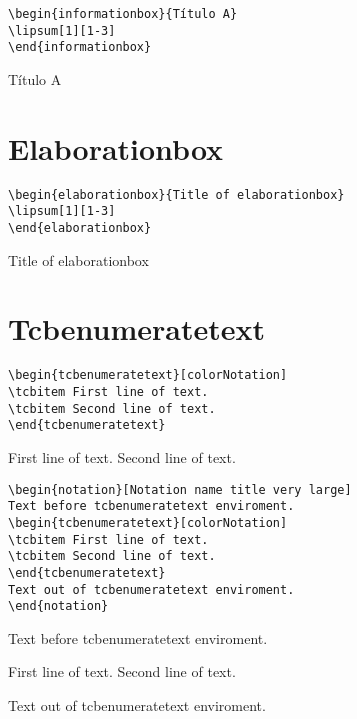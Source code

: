 \lipsum[1][1-3]

\begin{verbatim}
\begin{informationbox}{Título A}
\lipsum[1][1-3]
\end{informationbox}
\end{verbatim}
\begin{informationbox}{Título A}
\lipsum[1][1-3]
\end{informationbox}


\section{Elaborationbox}

\lipsum[1][1-3]

\begin{verbatim}
\begin{elaborationbox}{Title of elaborationbox}
\lipsum[1][1-3]
\end{elaborationbox}
\end{verbatim}
\begin{elaborationbox}{Title of elaborationbox}
\lipsum[1][1-3]
\end{elaborationbox}

\section{Tcbenumeratetext}

\begin{verbatim}
\begin{tcbenumeratetext}[colorNotation]
\tcbitem First line of text.
\tcbitem Second line of text.
\end{tcbenumeratetext}
\end{verbatim}
\begin{tcbenumeratetext}[colorNotation]
\tcbitem First line of text.
\tcbitem Second line of text.
\end{tcbenumeratetext}

\lipsum[1][1-3]

\begin{verbatim}
\begin{notation}[Notation name title very large]
Text before tcbenumeratetext enviroment.
\begin{tcbenumeratetext}[colorNotation]
\tcbitem First line of text.
\tcbitem Second line of text.
\end{tcbenumeratetext}
Text out of tcbenumeratetext enviroment.
\end{notation}
\end{verbatim}
\begin{notation}
Text before tcbenumeratetext enviroment.
\begin{tcbenumeratetext}[colorNotation]
\tcbitem First line of text.
\tcbitem Second line of text.
\end{tcbenumeratetext}
Text out of tcbenumeratetext enviroment.
\end{notation}

